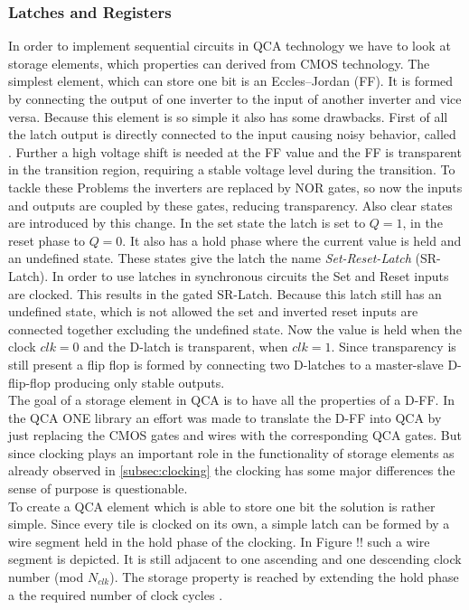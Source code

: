 \subsubsection{Latches and Registers}
In order to implement sequential circuits in QCA technology we have to look at storage elements, which properties can derived from CMOS technology.
The simplest element, which can store one bit is an Eccles–Jordan  (FF). It is formed by connecting the output of one inverter to the input of another inverter and vice versa. Because this element is so simple it also has some drawbacks. First of all the latch output is directly connected to the input causing noisy behavior, called  \cite{hawkins2012cmos}. Further a high voltage shift is needed at the FF value and the FF is transparent in the transition region, requiring a stable voltage level during the transition. To tackle these Problems the inverters are replaced by NOR gates, so now the inputs and outputs are coupled by these gates, reducing transparency. Also clear states are introduced by this change. In the set state the latch is set to $Q=1$, in the reset phase to $Q=0$. It also has a hold phase where the current value is held and an undefined state. These states give the latch the name \textit{Set-Reset-Latch} (SR-Latch). In order to use latches in synchronous circuits the Set and Reset inputs are clocked. This results in the gated SR-Latch. Because this latch still has an undefined state, which is not allowed the set and inverted reset inputs are connected together excluding the undefined state. Now the value is held when the clock $clk=0$ and the D-latch is transparent, when $clk=1$. Since transparency is still present a flip flop is formed by connecting two D-latches to a master-slave D-flip-flop producing only stable outputs.\\
The goal of a storage element in QCA is to have all the properties of a D-FF. In the QCA ONE library an effort was made to translate the D-FF into QCA by just replacing the CMOS gates and wires with the corresponding QCA gates. But since clocking plays an important role in the functionality of storage elements as already observed in \ref{subsec:clocking} the clocking has some major differences the sense of purpose is questionable.\\
To create a QCA element which is able to store one bit the solution is rather simple. Since every tile is clocked on its own, a simple latch can be formed by a wire segment held in the hold phase of the clocking. In Figure !! such a wire segment is depicted. It is still adjacent to one ascending and one descending clock number (mod $N_{clk}$). The storage property is reached by extending the hold phase a the required number of clock cycles \cite{Walter}. 
